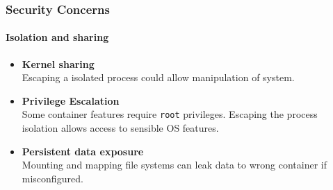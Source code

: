 \begin{frame}
    \frametitle{Security Concerns}
    \framesubtitle{Isolation and sharing}
    \begin{itemize}
        \item \textbf{Kernel sharing}\\
        Escaping a isolated process could allow manipulation of system.
        \item \textbf{Privilege Escalation}\\
        Some container features require \texttt{root} privileges.
        Escaping the process isolation allows access to sensible OS features.
        \item \textbf{Persistent data exposure}\\
        Mounting and mapping file systems can leak data to wrong container if misconfigured.
    \end{itemize}
\end{frame}